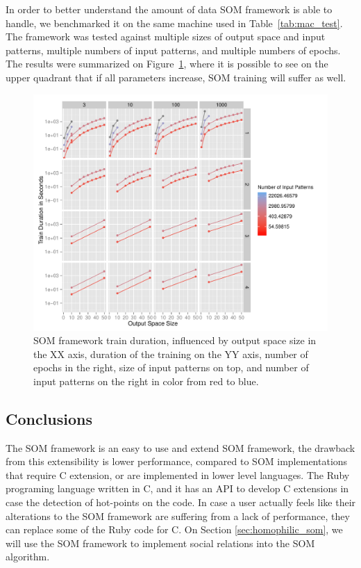 In order to better understand the amount of data \ac{SOM} framework is able to handle, we benchmarked it on the same machine used in Table~\ref{tab:mac_test}. The framework was tested against multiple sizes of output space and input patterns, multiple numbers of input patterns, and multiple numbers of epochs. 
The results were summarized on Figure~\ref{fig:benchmarkingsom}, where it is possible to see on the upper quadrant that if all parameters increase, \ac{SOM} training will suffer as well.

\begin{figure}[h!]
  \centering
  \includegraphics[width=0.8\linewidth]{./plots/som/benchmarking.pdf}
  \caption{SOM framework train duration, influenced by output space size in the XX axis, duration of the training on the YY axis, number of epochs in the right, size of input patterns on top, and number of input patterns on the right in color from red to blue.}
  \label{fig:benchmarkingsom}
\end{figure}

\subsection{Conclusions}
\label{sub:conclusionssom}
The \ac{SOM} framework is an easy to use and extend \ac{SOM} framework, the drawback from this extensibility is lower performance, compared to \ac{SOM} implementations that require C extension, or are implemented in lower level languages. 
The Ruby programing language written in C, and it has an API to develop C extensions in case the detection of hot-points on the code. In case a user actually feels like their alterations to the \ac{SOM} framework are suffering from a lack of performance, they can replace some of the Ruby code for C. 
On Section \ref{sec:homophilic_som}, we will use the \ac{SOM} framework to implement social relations into the \ac{SOM} algorithm.


